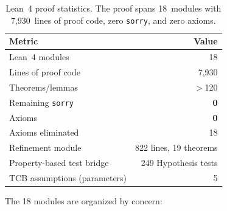 \documentclass[acmsmall,review,anonymous]{acmart}
\begin{document}
\begin{table}[t]
\centering
\caption{Lean~4 proof statistics. The proof spans 18~modules with
         7{,}930~lines of proof code, zero \texttt{sorry}, and zero
         axioms.}
\label{tab:proofstats}
\begin{tabular}{lr}
\toprule
\textbf{Metric} & \textbf{Value} \\
\midrule
Lean~4 modules & 18 \\
Lines of proof code & 7{,}930 \\
Theorems/lemmas & $>$120 \\
Remaining \texttt{sorry} & \textbf{0} \\
Axioms & \textbf{0} \\
Axioms eliminated & 18 \\
Refinement module & 822 lines, 19 theorems \\
Property-based test bridge & 249 Hypothesis tests \\
TCB assumptions (parameters) & 5 \\
\bottomrule
\end{tabular}
\end{table}

The 18 modules are organized by concern:
\end{document}
